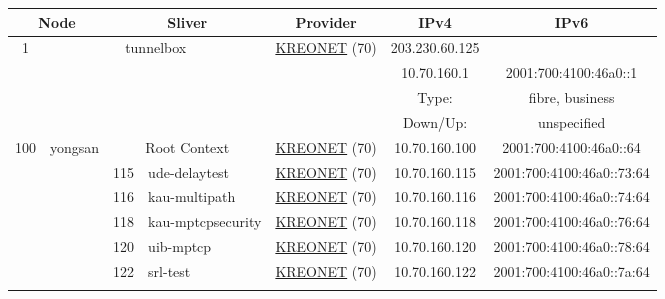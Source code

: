 \begin{small}
\begin{center}
\begin{longtable}{|c|c|c|c|c|c|c|c|}
 \multicolumn{2}{|p{8em}|}{Node} & \multicolumn{2}{|p{8em}|}{Sliver} & \multicolumn{2}{|p{8em}|}{Provider} & IPv4 & IPv6 \\ \hline
\endhead
 \multirow{4}{*}{\tiny{1}} & \multicolumn{3}{|c|}{\multirow{4}{*}{\tiny{tunnelbox}}} & \multicolumn{2}{|c|}{\multirow{4}{*}{\tiny{\href{http://www.kreonet.net}{KREONET} (70)}}} & \tiny{203.230.60.125} & \frownie{} \\* \cline{7-7}\cline{8-8}
  & \multicolumn{3}{|c|}{} & \multicolumn{2}{|c|}{} & \tiny{10.70.160.1} & \tiny{2001:700:4100:46a0::1} \\* \cline{7-7}\cline{8-8}
  & \multicolumn{3}{|c|}{} & \multicolumn{2}{|c|}{} & Type: & fibre, business \\* \cline{7-7}\cline{8-8}
  & \multicolumn{3}{|c|}{} & \multicolumn{2}{|c|}{} & Down/Up:  & unspecified \\ \hline
 \multirow{29}{*}{\tiny{100}} & \multicolumn{1}{|l|}{\multirow{29}{*}{\tiny{yongsan}}} & \multicolumn{2}{|c|}{\tiny{Root Context}} & \multicolumn{2}{|c|}{\tiny{\href{http://www.kreonet.net}{KREONET} (70)}} & \tiny{10.70.160.100} & \tiny{2001:700:4100:46a0::64} \\* \cline{3-3}\cline{4-4}\cline{5-5}\cline{6-6}\cline{7-7}\cline{8-8}
  &  & \tiny{115} & \multicolumn{1}{|l|}{\tiny{ude-delaytest}} & \multicolumn{2}{|c|}{\tiny{\href{http://www.kreonet.net}{KREONET} (70)}} & \tiny{10.70.160.115} & \tiny{2001:700:4100:46a0::73:64} \\* \cline{3-3}\cline{4-4}\cline{5-5}\cline{6-6}\cline{7-7}\cline{8-8}
  &  & \tiny{116} & \multicolumn{1}{|l|}{\tiny{kau-multipath}} & \multicolumn{2}{|c|}{\tiny{\href{http://www.kreonet.net}{KREONET} (70)}} & \tiny{10.70.160.116} & \tiny{2001:700:4100:46a0::74:64} \\* \cline{3-3}\cline{4-4}\cline{5-5}\cline{6-6}\cline{7-7}\cline{8-8}
  &  & \tiny{118} & \multicolumn{1}{|l|}{\tiny{kau-mptcpsecurity}} & \multicolumn{2}{|c|}{\tiny{\href{http://www.kreonet.net}{KREONET} (70)}} & \tiny{10.70.160.118} & \tiny{2001:700:4100:46a0::76:64} \\* \cline{3-3}\cline{4-4}\cline{5-5}\cline{6-6}\cline{7-7}\cline{8-8}
  &  & \tiny{120} & \multicolumn{1}{|l|}{\tiny{uib-mptcp}} & \multicolumn{2}{|c|}{\tiny{\href{http://www.kreonet.net}{KREONET} (70)}} & \tiny{10.70.160.120} & \tiny{2001:700:4100:46a0::78:64} \\* \cline{3-3}\cline{4-4}\cline{5-5}\cline{6-6}\cline{7-7}\cline{8-8}
  &  & \tiny{122} & \multicolumn{1}{|l|}{\tiny{srl-test}} & \multicolumn{2}{|c|}{\tiny{\href{http://www.kreonet.net}{KREONET} (70)}} & \tiny{10.70.160.122} & \tiny{2001:700:4100:46a0::7a:64} \\* \cline{3-3}\cline{4-4}\cline{5-5}\cline{6-6}\cline{7-7}\cline{8-8}

\end{longtable}
\end{center}
\end{small}
